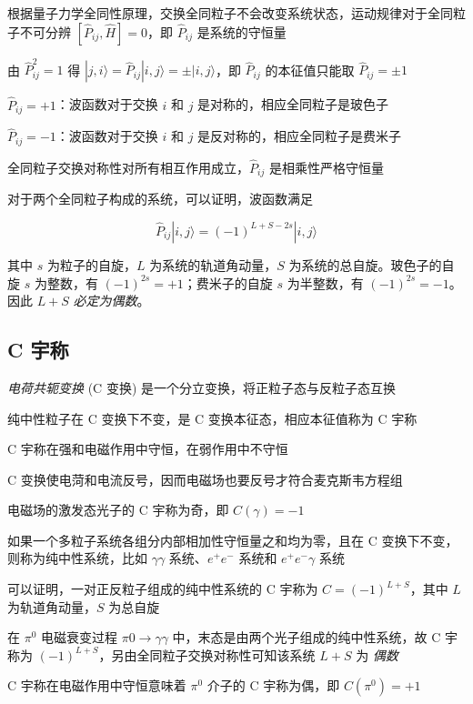 \documentclass[oneside,a4paper,openany,11pt]{ctexbook}
\begin{document}
根据量子力学全同性原理，交换全同粒子不会改变系统状态，运动规律对于全同粒子不可分辨 $[\hat{P}_{ij}, \hat{H}] = 0$，即 $\hat{P}_{ij}$ 是系统的守恒量

由 $\hat{P}_{ij}^2 = 1$ 得 $|j, i\rangle = \hat{P}_{ij} |i, j \rangle = \pm |i, j \rangle$，即 $\hat{P}_{ij}$ 的本征值只能取 $\hat{P}_{ij} = \pm 1$

$\hat{P}_{ij} = +1$：波函数对于交换 $i$ 和 $j$ 是对称的，相应全同粒子是玻色子

$\hat{P}_{ij} = -1$：波函数对于交换 $i$ 和 $j$ 是反对称的，相应全同粒子是费米子

全同粒子交换对称性对所有相互作用成立，$\hat{P}_{ij}$ 是相乘性严格守恒量

对于两个全同粒子构成的系统，可以证明，波函数满足

\begin{equation}
    \hat{P}_{ij} |i, j\rangle = (-1)^{L+S-2s} |i, j \rangle
\end{equation}

其中 $s$ 为粒子的自旋，$L$ 为系统的轨道角动量，$S$ 为系统的总自旋。玻色子的自旋 $s$ 为整数，有 $(-1)^{2s} = +1$；费米子的自旋 $s$ 为半整数，有 $(-1)^{2s} = -1$。因此 $L+S$ \emph{必定为偶数}。

\subsection{C 宇称}

\emph{电荷共轭变换} (C 变换) 是一个分立变换，将正粒子态与反粒子态互换

纯中性粒子在 C 变换下不变，是 C 变换本征态，相应本征值称为 C 宇称

C 宇称在强和电磁作用中守恒，在弱作用中不守恒

C 变换使电菏和电流反号，因而电磁场也要反号才符合麦克斯韦方程组

电磁场的激发态光子的 C 宇称为奇，即 $C(\gamma) = -1$

如果一个多粒子系统各组分内部相加性守恒量之和均为零，且在 C 变换下不变，则称为纯中性系统，比如 $\gamma\gamma$ 系统、$e^+ e^-$ 系统和 $e^+ e^- \gamma$ 系统

可以证明，一对正反粒子组成的纯中性系统的 C 宇称为 $C = (-1)^{L+S}$，其中 $L$ 为轨道角动量，$S$ 为总自旋

在 $\pi^0$ 电磁衰变过程 $\pi0 \to \gamma\gamma$ 中，末态是由两个光子组成的纯中性系统，故 C 宇称为 $(-1)^{L+S}$，另由全同粒子交换对称性可知该系统 $L+S$ 为 \emph{偶数}

C 宇称在电磁作用中守恒意味着 $\pi^0$ 介子的 C 宇称为偶，即 $C(\pi^0) = +1$
\end{document}
